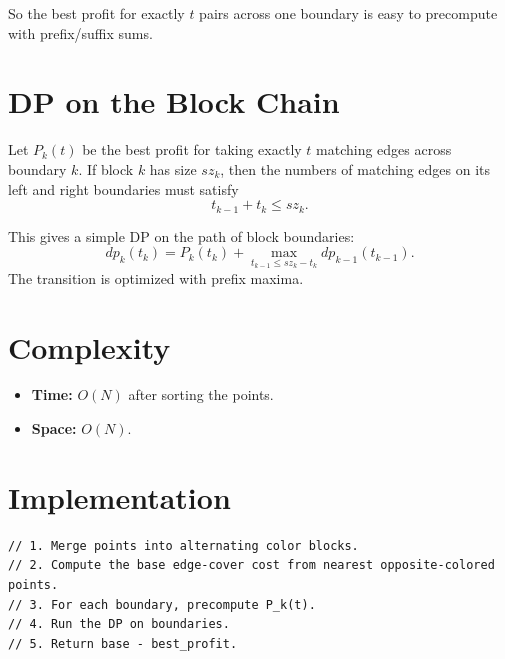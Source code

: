 \documentclass[11pt,a4paper]{article}
\begin{document}
So the best profit for exactly $t$ pairs across one boundary is easy to precompute with
prefix/suffix sums.

\section{DP on the Block Chain}
Let $P_k(t)$ be the best profit for taking exactly $t$ matching edges across boundary $k$.
If block $k$ has size $sz_k$, then the numbers of matching edges on its left and right boundaries
must satisfy
\[
t_{k-1}+t_k \le sz_k.
\]

This gives a simple DP on the path of block boundaries:
\[
dp_k(t_k)=P_k(t_k)+
\max_{t_{k-1}\le sz_k-t_k} dp_{k-1}(t_{k-1}).
\]
The transition is optimized with prefix maxima.

\section{Complexity}
\begin{itemize}
  \item \textbf{Time:} $O(N)$ after sorting the points.
  \item \textbf{Space:} $O(N)$.
\end{itemize}

\section{Implementation}
\begin{lstlisting}
// 1. Merge points into alternating color blocks.
// 2. Compute the base edge-cover cost from nearest opposite-colored points.
// 3. For each boundary, precompute P_k(t).
// 4. Run the DP on boundaries.
// 5. Return base - best_profit.
\end{lstlisting}
\end{document}

